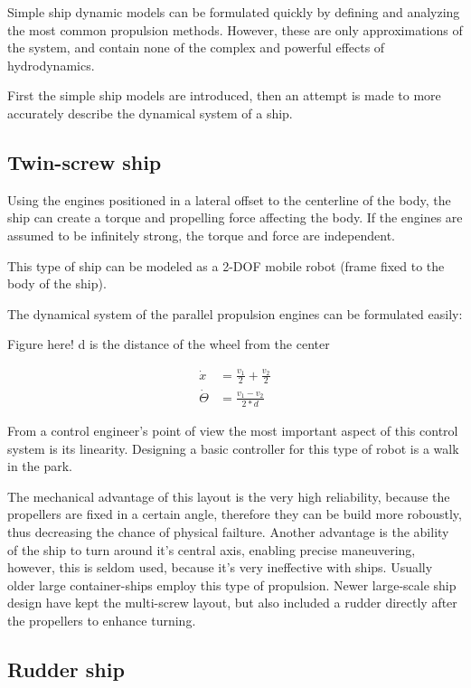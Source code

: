 Simple ship dynamic models can be formulated quickly by defining and analyzing the most common propulsion methods. However, these are only approximations of the system, and contain none of the complex and powerful effects of hydrodynamics.

First the simple ship models are introduced, then an attempt is made to more accurately describe the dynamical system of a ship.

\subsection{Twin-screw ship}

Using the engines positioned in a lateral offset to the centerline of the body, the ship can create a torque and propelling force affecting the body. If the engines are assumed to be infinitely strong, the torque and force are independent.

This type of ship can be modeled as a 2-DOF mobile robot (frame fixed to the body of the ship).

The dynamical system of the parallel propulsion engines can be formulated easily:


Figure here! d is the distance of the wheel from the center

\begin{align}
	\dot{x} &= \frac{v_1}{2} + \frac{v_2}{2} \\
    \dot{\Theta} &= \frac{v_1-v_2}{2*d}
\end{align}

From a control engineer’s point of view the most important aspect of this control system is its linearity. Designing a basic controller for this type of robot is a walk in the park.

The mechanical advantage of this layout is the very high reliability, because the propellers are fixed in a certain angle, therefore they can be build more roboustly, thus decreasing the chance of physical failture. Another advantage is the ability of the ship to turn around it’s central axis, enabling precise maneuvering, however, this is seldom used, because it’s very ineffective with ships.
Usually older large container-ships employ this type of propulsion. Newer large-scale ship design have kept the multi-screw layout, but also included a rudder directly after the propellers to enhance turning.

\subsection{Rudder ship}

